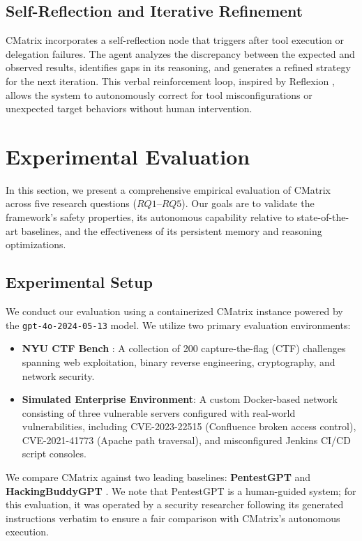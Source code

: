 \documentclass[conference,compsoc]{IEEEtran}
\begin{document}
\subsection{Self-Reflection and Iterative Refinement}
CMatrix incorporates a self-reflection node that triggers after tool execution or delegation failures. The agent analyzes the discrepancy between the expected and observed results, identifies gaps in its reasoning, and generates a refined strategy for the next iteration. This verbal reinforcement loop, inspired by Reflexion \cite{reflexion}, allows the system to autonomously correct for tool misconfigurations or unexpected target behaviors without human intervention.

\section{Experimental Evaluation} \label{sec:eval}
In this section, we present a comprehensive empirical evaluation of CMatrix across five research questions ($RQ1$--$RQ5$). Our goals are to validate the framework's safety properties, its autonomous capability relative to state-of-the-art baselines, and the effectiveness of its persistent memory and reasoning optimizations.

\subsection{Experimental Setup}
We conduct our evaluation using a containerized CMatrix instance powered by the \texttt{gpt-4o-2024-05-13} model. We utilize two primary evaluation environments:
\begin{itemize}
    \item \textbf{NYU CTF Bench} \cite{nyuctf}: A collection of 200 capture-the-flag (CTF) challenges spanning web exploitation, binary reverse engineering, cryptography, and network security.
    \item \textbf{Simulated Enterprise Environment}: A custom Docker-based network consisting of three vulnerable servers configured with real-world vulnerabilities, including CVE-2023-22515 (Confluence broken access control), CVE-2021-41773 (Apache path traversal), and misconfigured Jenkins CI/CD script consoles.
\end{itemize}

We compare CMatrix against two leading baselines: \textbf{PentestGPT} \cite{pentestgpt} and \textbf{HackingBuddyGPT} \cite{hackingbuddygpt}. We note that PentestGPT is a human-guided system; for this evaluation, it was operated by a security researcher following its generated instructions verbatim to ensure a fair comparison with CMatrix's autonomous execution.
\end{document}
